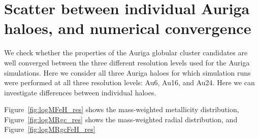 \documentclass[a4paper,fleqn,usenatbib]{mnras}
\begin{document}






\clearpage
\appendix
\section{Scatter between individual Auriga haloes, and numerical convergence}
\label{sec:scatter-convergence}
We check whether the properties of the Auriga globular cluster candidates
are well converged between the three different resolution levels used for the
Auriga simulations. Here we consider all three Auriga haloes for which simulation
runs were performed at all three resolution levels: Au6, Au16, and Au24. Here
we can investigate differences between individual haloes.

Figure~\ref{fig:logMFeH_res} shows the mass-weighted metallicity distribution,
Figure~\ref{fig:logMRgc_res} shows the mass-weighted radial distribution, and
Figure~\ref{fig:logMRgcFeH_res}
\end{document}
